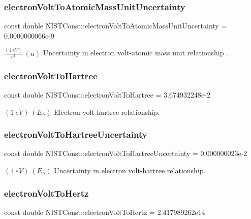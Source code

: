 \subsubsection{\texorpdfstring{electron\+Volt\+To\+Atomic\+Mass\+Unit\+Uncertainty}{electronVoltToAtomicMassUnitUncertainty}}
{\footnotesize\ttfamily const double N\+I\+S\+T\+Const\+::electron\+Volt\+To\+Atomic\+Mass\+Unit\+Uncertainty = 0.\+0000000066e-\/9}

$\frac{(1\ eV)}{c^2}\ (u)$ Uncertainty in electron volt-\/atomic mass unit relationship . \mbox{\label{group___electron_volt_gab05ba497cc5a6bd566356469e9de003a}} 
\subsubsection{\texorpdfstring{electron\+Volt\+To\+Hartree}{electronVoltToHartree}}
{\footnotesize\ttfamily const double N\+I\+S\+T\+Const\+::electron\+Volt\+To\+Hartree = 3.\+674932248e-\/2}

$(1\ eV) \ (E_h)$ Electron volt-\/hartree relationship. \mbox{\label{group___electron_volt_ga0abfaf6edc874d80488beab0633f353a}} 
\subsubsection{\texorpdfstring{electron\+Volt\+To\+Hartree\+Uncertainty}{electronVoltToHartreeUncertainty}}
{\footnotesize\ttfamily const double N\+I\+S\+T\+Const\+::electron\+Volt\+To\+Hartree\+Uncertainty = 0.\+000000023e-\/2}

$(1\ eV) \ (E_h)$ Uncertainty in electron volt-\/hartree relationship. \mbox{\label{group___electron_volt_gae80c1242d33bf681a09a87d20cd4162e}} 
\subsubsection{\texorpdfstring{electron\+Volt\+To\+Hertz}{electronVoltToHertz}}
{\footnotesize\ttfamily const double N\+I\+S\+T\+Const\+::electron\+Volt\+To\+Hertz = 2.\+417989262e14}

